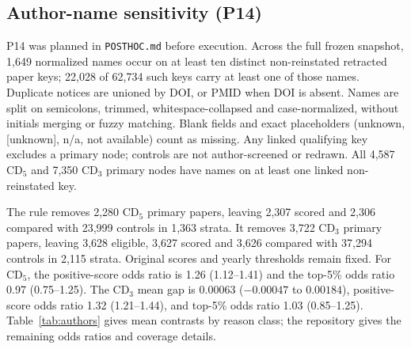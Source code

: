 \subsection{Author-name sensitivity (P14)}
P14 was planned in \texttt{POSTHOC.md} before execution. Across the full frozen snapshot,
1,649 normalized names occur on at least ten distinct non-reinstated retracted paper keys; 22,028 of 62,734 such
keys carry at least one of those names. Duplicate notices are unioned by DOI, or PMID when DOI is absent.
Names are split on semicolons, trimmed, whitespace-collapsed and case-normalized, without initials merging or
fuzzy matching. Blank fields and exact placeholders (unknown, [unknown], n/a, not available) count as missing.
Any linked qualifying key excludes a primary node; controls are not author-screened or redrawn.
All 4,587 CD$_5$ and 7,350 CD$_3$ primary nodes have names on at least one linked non-reinstated key.

The rule removes 2,280 CD$_5$ primary papers, leaving 2,307 scored and 2,306 compared with 23,999 controls in
1,363 strata. It removes 3,722 CD$_3$ primary papers, leaving 3,628 eligible, 3,627 scored and 3,626 compared
with 37,294 controls in 2,115 strata. Original scores and yearly thresholds remain fixed.
For CD$_5$, the positive-score odds ratio is 1.26 (1.12--1.41) and the top-5\% odds ratio 0.97 (0.75--1.25).
The CD$_3$ mean gap is 0.00063 ($-0.00047$ to $0.00184$), positive-score odds ratio 1.32 (1.21--1.44), and
top-5\% odds ratio 1.03 (0.85--1.25). Table~\ref{tab:authors} gives mean contrasts by reason class;
the repository gives the remaining odds ratios and coverage details.

